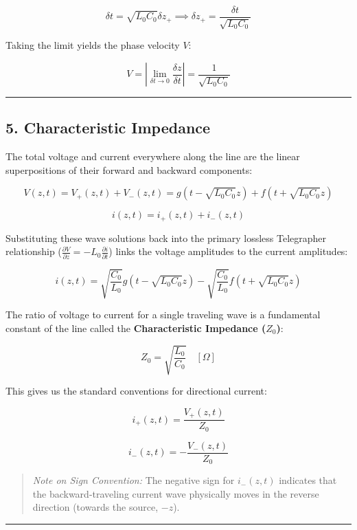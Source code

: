 \documentclass[
]{article}
\begin{document}
\[\delta t = \sqrt{L_0 C_0} \delta z_+ \implies \delta z_+ = \frac{\delta t}{\sqrt{L_0 C_0}}\]

Taking the limit yields the phase velocity \(V\):

\[V = \left| \lim_{\delta t \to 0} \frac{\delta z}{\delta t} \right| = \frac{1}{\sqrt{L_0 C_0}}\]

\begin{center}\rule{0.5\linewidth}{0.5pt}\end{center}

\subsection{5. Characteristic Impedance}\label{characteristic-impedance}

The total voltage and current everywhere along the line are the linear
superpositions of their forward and backward components:

\[V(z,t) = V_+(z,t) + V_-(z,t) = g(t - \sqrt{L_0 C_0}z) + f(t + \sqrt{L_0 C_0}z)\]

\[i(z,t) = i_+(z,t) + i_-(z,t)\]

Substituting these wave solutions back into the primary lossless
Telegrapher relationship
(\(\frac{\partial V}{\partial z} = -L_0 \frac{\partial i}{\partial t}\))
links the voltage amplitudes to the current amplitudes:

\[i(z,t) = \sqrt{\frac{C_0}{L_0}} g(t - \sqrt{L_0 C_0}z) - \sqrt{\frac{C_0}{L_0}} f(t + \sqrt{L_0 C_0}z)\]

The ratio of voltage to current for a single traveling wave is a
fundamental constant of the line called the \textbf{Characteristic
Impedance (\(Z_0\))}:

\[Z_0 = \sqrt{\frac{L_0}{C_0}} \quad [\Omega]\]

This gives us the standard conventions for directional current:

\[i_+(z,t) = \frac{V_+(z,t)}{Z_0}\]

\[i_-(z,t) = -\frac{V_-(z,t)}{Z_0}\]

\begin{quote}
\emph{Note on Sign Convention:} The negative sign for \(i_-(z,t)\)
indicates that the backward-traveling current wave physically moves in
the reverse direction (towards the source, \(-z\)).
\end{quote}

\begin{center}\rule{0.5\linewidth}{0.5pt}\end{center}
\end{document}
